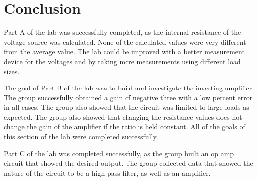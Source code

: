 \documentclass[twocolumn, amsmath]{revtex4}
\begin{document}
\section{Conclusion}
Part A of the lab was successfully completed, as the internal resistance of the voltage source was calculated. None of the calculated values were very different from the average value. The lab could be improved with a better measurement device for the voltages and by taking more measurements using different load sizes.

The goal of Part B of the lab was to build and investigate the inverting amplifier. The group successfully obtained a gain of negative three with a low percent error in all cases. The group also showed that the circuit was limited to large loads as expected. The group also showed that changing the resistance values does not change the gain of the amplifier if the ratio is held constant. All of the goals of this section of the lab were completed successfully.

Part C of the lab was completed successfully, as the group built an op amp circuit that showed the desired output. The group collected data that showed the nature of the circuit to be a high pass filter, as well as an amplifier.
\end{document}
